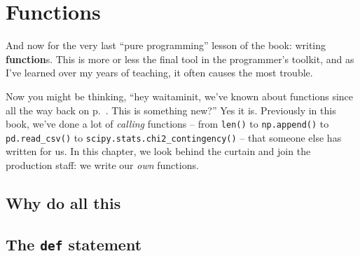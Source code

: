 
\chapter{Functions}
\label{ch:functions}


And now for the very last ``pure programming'' lesson of the book: writing
\textbf{function}s. This is more or less the final tool in the programmer's
toolkit, and as I've learned over my years of teaching, it often causes the
most trouble.

Now you might be thinking, ``hey waitaminit, we've known about functions since
all the way back on p.~\pageref{function}. This is something new?'' Yes it is.
Previously in this book, we've done a lot of \textit{calling} functions -- from
\texttt{len()} to \texttt{np.append()} to \texttt{pd.read\_csv()} to
\texttt{scipy.stats.chi2\_contingency()} -- that someone else has written for
us. In this chapter, we look behind the curtain and join the production staff:
we write our \textit{own} functions.

\section{Why do all this}

\section{The \texttt{def} statement}



